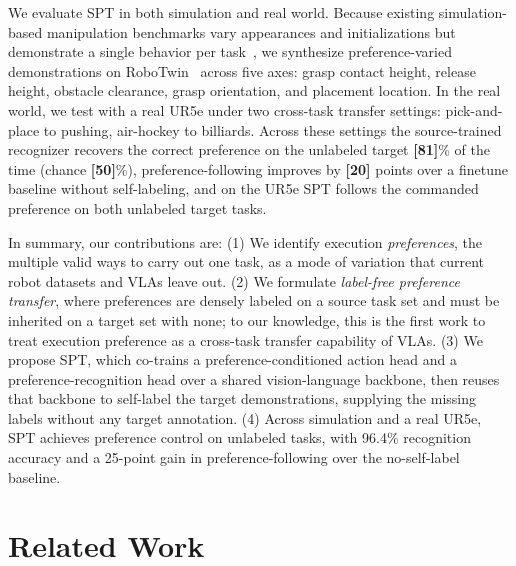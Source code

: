 \documentclass{article}
\begin{document}
We evaluate SPT in both simulation and real world. Because existing simulation-based manipulation benchmarks vary appearances and initializations but demonstrate a single behavior per task~\citep{libero, liberoplus}, we synthesize preference-varied demonstrations on RoboTwin~\citep{robotwin} across five axes: grasp contact height, release height, obstacle clearance, grasp orientation, and placement location. In the real world, we test with a real UR5e under two cross-task transfer settings: pick-and-place to pushing, air-hockey to billiards.
Across these settings the source-trained recognizer recovers the correct preference on the unlabeled target \textbf{[81]}\% of the time (chance \textbf{[50]}\%), preference-following improves by \textbf{[20]} points over a finetune baseline without self-labeling, and on the UR5e SPT follows the commanded preference on both unlabeled target tasks.

In summary, our contributions are:
(1) We identify execution \emph{preferences}, the multiple valid ways to carry out one task, as a mode of variation that current robot datasets and VLAs leave out.
(2) We formulate \emph{label-free preference transfer}, where preferences are densely labeled on a source task set and must be inherited on a target set with none; to our knowledge, this is the first work to treat execution preference as a cross-task transfer capability of VLAs.
(3) We propose SPT, which co-trains a preference-conditioned action head and a preference-recognition head over a shared vision-language backbone, then reuses that backbone to self-label the target demonstrations, supplying the missing labels without any target annotation.
(4) Across simulation and a real UR5e, SPT achieves preference control on unlabeled tasks, with 96.4\% recognition accuracy and a 25-point gain in preference-following over the no-self-label baseline.


 




\section{Related Work}
\label{sec:related}
\end{document}
